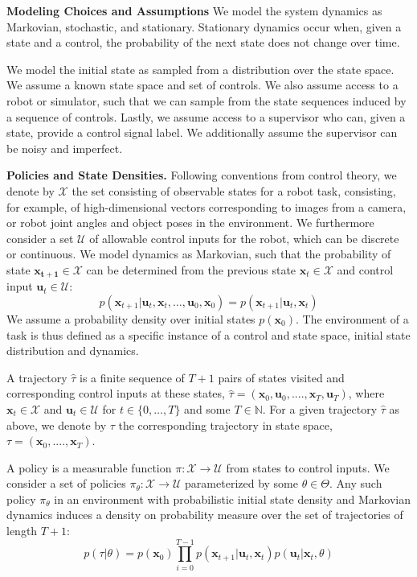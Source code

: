 \documentclass[10pt, conference]{ieeeconf}      %
\newcommand{\bu}{\mathbf{u}}
\newcommand{\bx}{\mathbf{x}}
\begin{document}
\noindent\textbf{Modeling Choices and Assumptions}  We model the system dynamics as Markovian, stochastic, and stationary. Stationary dynamics occur when, given a state and a control, the probability of the next state does not change over time. 

We model the initial state as sampled from a distribution over the state space.
We assume a known state space and set of controls. We also assume access to a robot or simulator, such that we  can sample from the state sequences induced by a sequence of controls.   Lastly, we assume access to a supervisor who can, given a state, provide a control signal label. We additionally assume the supervisor can be noisy and imperfect. 



\noindent\textbf{Policies and State Densities.}
Following conventions from control theory, we denote by $\mathcal{X}$ the set consisting of observable states for a robot task, consisting, for example, of 
high-dimensional vectors corresponding to images from a camera, or robot joint angles and object poses in the environment.
We furthermore consider a set $\mathcal{U}$ of allowable control inputs for the robot, which can be discrete or
continuous. We model dynamics as Markovian, such that the probability of state $\mathbf{x_{t+1}}\in
\mathcal{X}$ can be determined from the previous state $\mathbf{x}_t\in\mathcal{X}$ and control input $\mathbf{u}_t\in
\mathcal{U}$: 
$$p(\bx_{t+1}|\bu_{t},\bx_{t}, \ldots, \bu_{0}, \bx_{0})=p(\bx_{t+1}|\bu_{t}, \bx_t)$$
We assume a probability density over initial states $p(\bx_0)$. The environment of a task is thus defined as a specific instance of a control and state space, initial state distribution and dynamics. 



A trajectory $\hat{\tau}$ is a finite sequence of $T+1$ pairs of states visited and corresponding
control inputs at these states, $\hat{\tau} = (\mathbf{x}_0,\mathbf{u}_0, ...., \mathbf{x}_T,\mathbf{u}_T)$, where $\bx_t\in \mathcal{X}$
and $\bu_t\in \mathcal{U}$ for $t\in \{0, \ldots, T\}$ and some $T\in \mathbb{N}$.  
For a given trajectory $\hat{\tau}$ as above, we denote by ${\tau}$ the corresponding trajectory in state space,
${\tau} = (\bx_0,....,\bx_T)$. 


A policy is a measurable function $\pi: \mathcal{X} \to \mathcal{U}$ from states to control inputs. 
We consider a set of policies $\pi_{\theta}:\mathcal{X}\to \mathcal{U}$ parameterized by some $\theta\in \Theta$. Any such policy $\pi_{\theta}$ in an environment with probabilistic initial state density and Markovian dynamics
induces a density on probability measure over the set of  trajectories of length $T+1$: $$p(\tau | \theta)=
p(\bx_0)\prod_{i=0}^{T-1}p(\bx_{t+1}|\bu_t,\bx_t)p(\bu_t|\bx_t,\theta)$$
\end{document}
